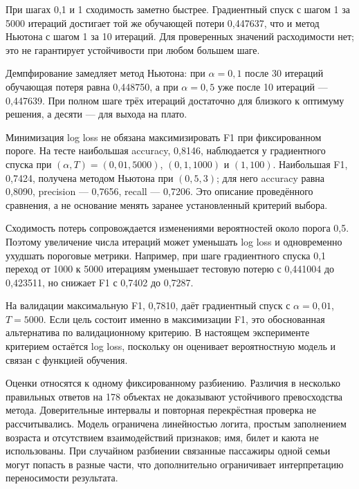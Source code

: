 При шагах 0,1 и 1 сходимость заметно быстрее. Градиентный спуск с шагом 1 за 5000 итераций достигает той же обучающей потери 0,447637, что и метод Ньютона с шагом 1 за 10 итераций. Для проверенных значений расходимости нет; это не гарантирует устойчивости при любом большем шаге.

Демпфирование замедляет метод Ньютона: при $\alpha=0{,}1$ после 30 итераций обучающая потеря равна 0,448750, а при $\alpha=0{,}5$ уже после 10 итераций — 0,447639. При полном шаге трёх итераций достаточно для близкого к оптимуму решения, а десяти — для выхода на плато.

Минимизация log loss не обязана максимизировать F1 при фиксированном пороге. На тесте наибольшая accuracy, 0,8146, наблюдается у градиентного спуска при $(\alpha,T)=(0{,}01,5000)$, $(0{,}1,1000)$ и $(1,100)$. Наибольшая F1, 0,7424, получена методом Ньютона при $(0{,}5,3)$; для него accuracy равна 0,8090, precision — 0,7656, recall — 0,7206. Это описание проведённого сравнения, а не основание менять заранее установленный критерий выбора.

Сходимость потерь сопровождается изменениями вероятностей около порога 0,5. Поэтому увеличение числа итераций может уменьшать log loss и одновременно ухудшать пороговые метрики. Например, при шаге градиентного спуска 0,1 переход от 1000 к 5000 итерациям уменьшает тестовую потерю с 0,441004 до 0,423511, но снижает F1 с 0,7402 до 0,7287.

На валидации максимальную F1, 0,7810, даёт градиентный спуск с $\alpha=0{,}01$, $T=5000$. Если цель состоит именно в максимизации F1, это обоснованная альтернатива по валидационному критерию. В настоящем эксперименте критерием остаётся log loss, поскольку он оценивает вероятностную модель и связан с функцией обучения.

Оценки относятся к одному фиксированному разбиению. Различия в несколько правильных ответов на 178 объектах не доказывают устойчивого превосходства метода. Доверительные интервалы и повторная перекрёстная проверка не рассчитывались. Модель ограничена линейностью логита, простым заполнением возраста и отсутствием взаимодействий признаков; имя, билет и каюта не использованы. При случайном разбиении связанные пассажиры одной семьи могут попасть в разные части, что дополнительно ограничивает интерпретацию переносимости результата.


